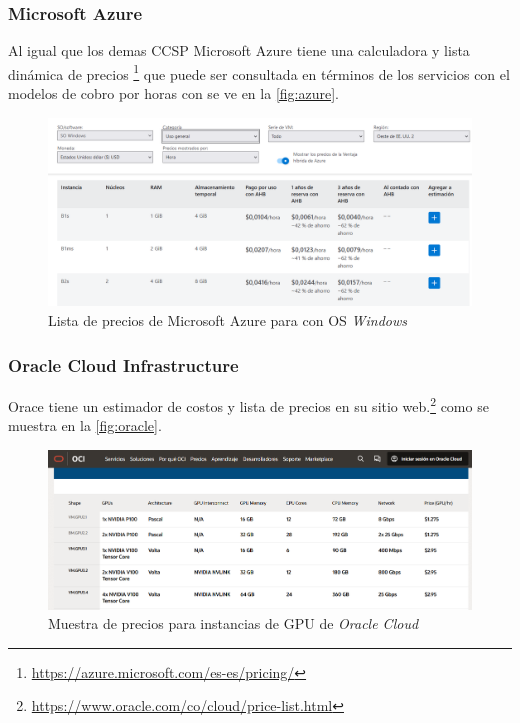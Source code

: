 \subsubsection{Microsoft Azure}
Al igual que los demas \acrshort{CCSP} \gls{Microsoft Azure} tiene una calculadora y lista dinámica de precios \footnote{\url{https://azure.microsoft.com/es-es/pricing/}} que puede ser consultada en términos de los servicios con el modelos de cobro por horas con se ve en la \autoref{fig:azure}.
\begin{figure}[h]
    \centering
    \includegraphics[width=\textwidth]{gfx/azure.png}
    \caption{Lista de precios de \gls{Microsoft Azure} para  con \acrshort{OS} \emph{Windows}}
    \label{fig:azure}
\end{figure}

\subsubsection{Oracle Cloud Infrastructure}
Orace tiene un estimador de costos y lista de precios en su sitio web.\footnote {\url{https://www.oracle.com/co/cloud/price-list.html}} como se muestra en la \autoref{fig:oracle}.
\begin{figure}[h]
    \centering
    \includegraphics[width=\textwidth]{gfx/oracle.png}
    \caption{Muestra de precios para instancias de \acrshort{GPU} de \emph{Oracle Cloud}}
    \label{fig:oracle}
\end{figure}

